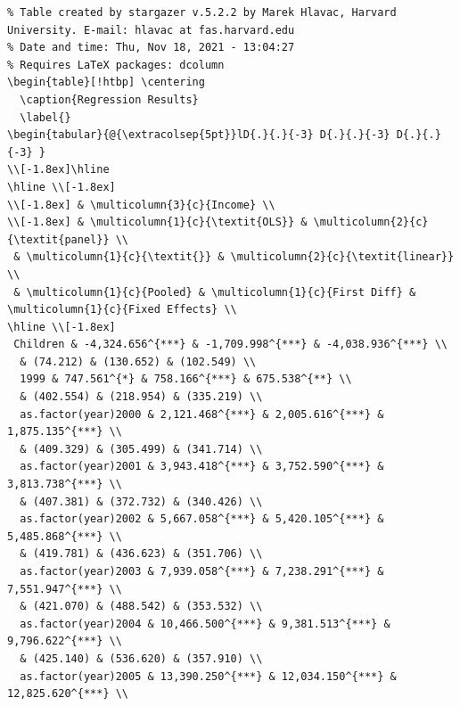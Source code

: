 \documentclass[
]{article}
\begin{document}
\begin{verbatim}
% Table created by stargazer v.5.2.2 by Marek Hlavac, Harvard University. E-mail: hlavac at fas.harvard.edu
% Date and time: Thu, Nov 18, 2021 - 13:04:27
% Requires LaTeX packages: dcolumn 
\begin{table}[!htbp] \centering 
  \caption{Regression Results} 
  \label{} 
\begin{tabular}{@{\extracolsep{5pt}}lD{.}{.}{-3} D{.}{.}{-3} D{.}{.}{-3} } 
\\[-1.8ex]\hline 
\hline \\[-1.8ex] 
\\[-1.8ex] & \multicolumn{3}{c}{Income} \\ 
\\[-1.8ex] & \multicolumn{1}{c}{\textit{OLS}} & \multicolumn{2}{c}{\textit{panel}} \\ 
 & \multicolumn{1}{c}{\textit{}} & \multicolumn{2}{c}{\textit{linear}} \\ 
 & \multicolumn{1}{c}{Pooled} & \multicolumn{1}{c}{First Diff} & \multicolumn{1}{c}{Fixed Effects} \\ 
\hline \\[-1.8ex] 
 Children & -4,324.656^{***} & -1,709.998^{***} & -4,038.936^{***} \\ 
  & (74.212) & (130.652) & (102.549) \\ 
  1999 & 747.561^{*} & 758.166^{***} & 675.538^{**} \\ 
  & (402.554) & (218.954) & (335.219) \\ 
  as.factor(year)2000 & 2,121.468^{***} & 2,005.616^{***} & 1,875.135^{***} \\ 
  & (409.329) & (305.499) & (341.714) \\ 
  as.factor(year)2001 & 3,943.418^{***} & 3,752.590^{***} & 3,813.738^{***} \\ 
  & (407.381) & (372.732) & (340.426) \\ 
  as.factor(year)2002 & 5,667.058^{***} & 5,420.105^{***} & 5,485.868^{***} \\ 
  & (419.781) & (436.623) & (351.706) \\ 
  as.factor(year)2003 & 7,939.058^{***} & 7,238.291^{***} & 7,551.947^{***} \\ 
  & (421.070) & (488.542) & (353.532) \\ 
  as.factor(year)2004 & 10,466.500^{***} & 9,381.513^{***} & 9,796.622^{***} \\ 
  & (425.140) & (536.620) & (357.910) \\ 
  as.factor(year)2005 & 13,390.250^{***} & 12,034.150^{***} & 12,825.620^{***} \\ 

\end{verbatim}
\end{document}
